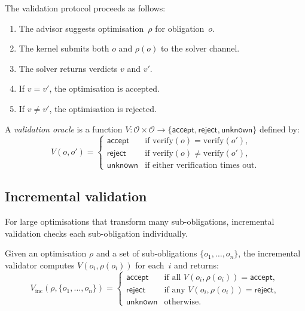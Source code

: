 \documentclass[11pt]{article}
\begin{document}
The validation protocol proceeds as follows:
\begin{enumerate}
\item The advisor suggests optimisation~$\rho$ for obligation~$o$.
\item The kernel submits both $o$ and $\rho(o)$ to the solver
      channel.
\item The solver returns verdicts $v$ and $v'$.
\item If $v = v'$, the optimisation is accepted.
\item If $v \neq v'$, the optimisation is rejected.
\end{enumerate}

\begin{definition}\label{def:valoracle}
A \emph{validation oracle} is a function
$V \colon \mathcal{O} \times \mathcal{O} \to \{
\mathsf{accept}, \mathsf{reject}, \mathsf{unknown}\}$
defined by:
\[
  V(o, o') = \begin{cases}
    \mathsf{accept} & \text{if } \mathrm{verify}(o) =
      \mathrm{verify}(o'), \\
    \mathsf{reject} & \text{if } \mathrm{verify}(o) \neq
      \mathrm{verify}(o'), \\
    \mathsf{unknown} & \text{if either verification times out.}
  \end{cases}
\]
\end{definition}

\subsection{Incremental validation}

For large optimisations that transform many sub-obligations,
incremental validation checks each sub-obligation individually.

\begin{definition}\label{def:incval}
Given an optimisation $\rho$ and a set of sub-obligations
$\{o_1, \ldots, o_n\}$, the incremental validator computes
$V(o_i, \rho(o_i))$ for each~$i$ and returns:
\[
  V_{\mathrm{inc}}(\rho, \{o_1, \ldots, o_n\}) =
  \begin{cases}
    \mathsf{accept} & \text{if all } V(o_i, \rho(o_i)) =
      \mathsf{accept}, \\
    \mathsf{reject} & \text{if any } V(o_i, \rho(o_i)) =
      \mathsf{reject}, \\
    \mathsf{unknown} & \text{otherwise.}
  \end{cases}
\]
\end{definition}
\end{document}
